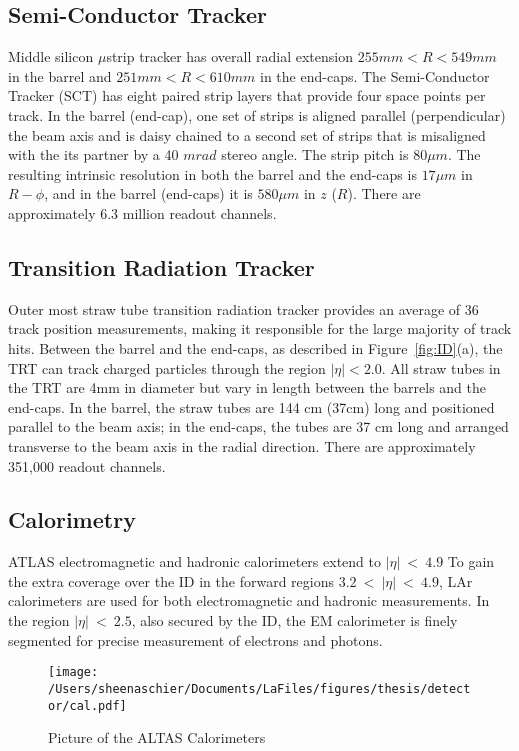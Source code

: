 \subsection{Semi-Conductor Tracker}
Middle silicon $\mu$strip tracker has overall radial extension $255 mm < R < 549 mm$ in the barrel and $251 mm < R < 610 mm$ in the end-caps.  The Semi-Conductor Tracker (SCT) has eight paired strip layers that provide four space points per track.  In the barrel (end-cap), one set of strips is aligned parallel (perpendicular) the beam axis and is daisy chained to a second set of strips that is misaligned with the its partner by a 40 $mrad$ stereo angle.  The strip pitch is $80\mu m$.  The resulting intrinsic resolution in both the barrel and the end-caps is $17\mu m$ in  $R-\phi$, and in the barrel (end-caps) it is $580 \mu m$ in $z$ ($R$).  There are approximately 6.3 million readout channels.
\subsection{Transition Radiation Tracker}
Outer most straw tube transition radiation tracker provides an average of 36 track position measurements, making it responsible for the large majority of track hits.   Between the barrel and the end-caps, as described in Figure~\ref{fig:ID}(a), the TRT can track charged particles through the region $|\eta| < 2.0$.  All straw tubes in the TRT are 4mm in diameter but vary in length between the barrels and the end-caps.  In the barrel, the straw tubes are 144 cm (37cm) long and positioned parallel to the beam axis; in the end-caps, the tubes are 37 cm long and arranged transverse to the beam axis in the radial direction.  There are approximately 351,000 readout channels.


\subsection{Calorimetry}
ATLAS electromagnetic and hadronic calorimeters extend to $|\eta|~<~4.9$  To gain the extra coverage over the ID in the forward regions $3.2~<~|\eta|~<~4.9$, LAr calorimeters are used for both electromagnetic and hadronic measurements.  In the region  $|\eta|~<~2.5$, also secured by the ID, the EM calorimeter is finely segmented for precise measurement of electrons and photons. 

  \begin{figure}[tbp]
  \centering
 \texttt{[image: /Users/sheenaschier/Documents/LaFiles/figures/thesis/detector/cal.pdf]}
    \caption{Picture of the ALTAS Calorimeters}
   \label{fig:cal}
 \end{figure}

